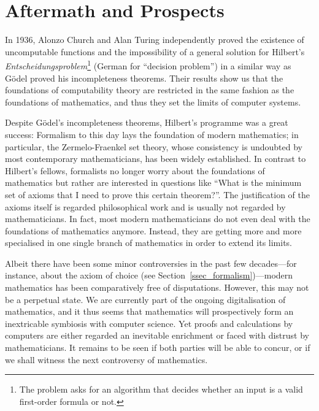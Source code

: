 \documentclass{article}
\begin{document}
\section{Aftermath and Prospects}
In 1936, Alonzo Church and Alan Turing independently proved the existence of uncomputable functions and the impossibility of a general solution for Hilbert's \textit{Entscheidungspro\-blem}\footnote{The problem asks for an algorithm that decides whether an input is a valid first-order formula or not.} (German for ``decision problem'') in a similar way as Gödel proved his incompleteness theorems. Their results show us that the foundations of computability theory are restricted in the same fashion as the foundations of mathematics, and thus they set the limits of computer systems.

Despite Gödel's incompleteness theorems, Hilbert's programme was a great success: Formalism to this day lays the foundation of modern mathematics; in particular, the Zermelo-Fraenkel set theory, whose consistency is undoubted by most contemporary mathematicians, has been widely established.
In contrast to Hilbert's fellows, formalists no longer worry about the foundations of mathematics but rather are interested in questions like ``What is the minimum set of axioms that I need to prove this certain theorem?''. The justification of the axioms itself is regarded philosophical work and is usually not regarded by mathematicians. In fact, most modern mathematicians do not even deal with the foundations of mathematics anymore. Instead, they are getting more and more specialised in one single branch of mathematics in order to extend its limits.

Albeit there have been some minor controversies in the past few decades---for instance, about the axiom of choice (see Section~\ref{ssec_formalism})---modern mathematics has been comparatively free of disputations. However, this may not be a perpetual state. We are currently part of the ongoing digitalisation of mathematics, and it thus seems that mathematics will prospectively form an inextricable symbiosis with computer science. Yet proofs and calculations by computers are either regarded an inevitable enrichment or faced with distrust by mathematicians. It remains to be seen if both parties will be able to concur, or if we shall witness the next controversy of mathematics.

\newpage
{}


\end{document}
